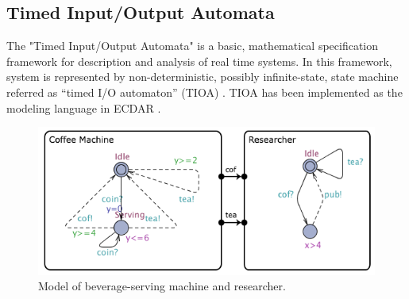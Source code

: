 \subsection{Timed Input/Output Automata}
\label{background-tioa}

The "Timed Input/Output Automata" is a basic, mathematical specification
framework for description and analysis of real time systems.  In this framework,
system is represented by non-deterministic, possibly infinite-state, state
machine referred as “timed I/O automaton” (TIOA)
\cite{Kaynar:2006:TTI:1203437}. TIOA has been implemented as the modeling
language in ECDAR \cite{conf/atva/DavidLLNW10}.

\begin{figure}[t]
\label{simple-model}
\begin{centering}
\includegraphics[scale=0.6]{images/simplefied_uni}
\par\end{centering}
\caption{Model of beverage-serving machine and researcher.}
\label{bev-machine}
\end{figure}

